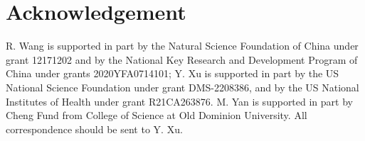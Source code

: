 \documentclass[11pt]{article}
\begin{document}
\section*{Acknowledgement}

R. Wang is supported in part by the Natural Science Foundation of China under grant 12171202 and by the National Key Research and Development Program of China under grants 2020YFA0714101; Y. Xu is supported in part by the US National Science Foundation under grant DMS-2208386, and by the US National Institutes of Health under grant R21CA263876. M. Yan is supported in part by Cheng Fund from College of Science at Old Dominion University. All correspondence should be sent to Y. Xu.





 



\end{document}

